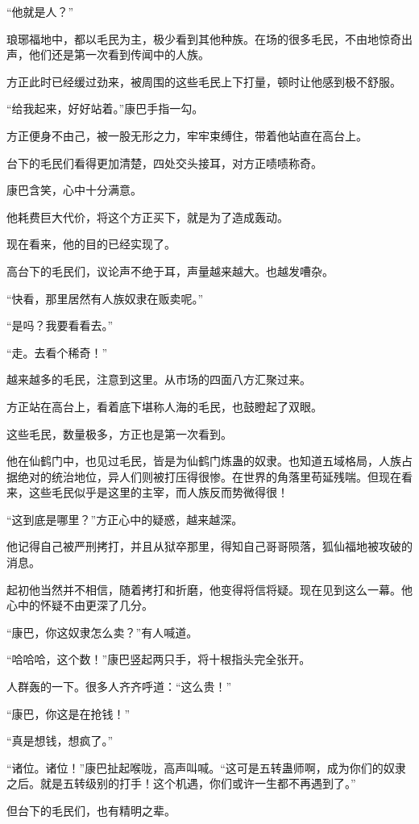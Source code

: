 \begin{this_body}
“他就是人？”

琅琊福地中，都以毛民为主，极少看到其他种族。在场的很多毛民，不由地惊奇出声，他们还是第一次看到传闻中的人族。

方正此时已经缓过劲来，被周围的这些毛民上下打量，顿时让他感到极不舒服。

“给我起来，好好站着。”康巴手指一勾。

方正便身不由己，被一股无形之力，牢牢束缚住，带着他站直在高台上。

台下的毛民们看得更加清楚，四处交头接耳，对方正啧啧称奇。

康巴含笑，心中十分满意。

他耗费巨大代价，将这个方正买下，就是为了造成轰动。

现在看来，他的目的已经实现了。

高台下的毛民们，议论声不绝于耳，声量越来越大。也越发嘈杂。

“快看，那里居然有人族奴隶在贩卖呢。”

“是吗？我要看看去。”

“走。去看个稀奇！”

越来越多的毛民，注意到这里。从市场的四面八方汇聚过来。

方正站在高台上，看着底下堪称人海的毛民，也鼓瞪起了双眼。

这些毛民，数量极多，方正也是第一次看到。

他在仙鹤门中，也见过毛民，皆是为仙鹤门炼蛊的奴隶。也知道五域格局，人族占据绝对的统治地位，异人们则被打压得很惨。在世界的角落里苟延残喘。但现在看来，这些毛民似乎是这里的主宰，而人族反而势微得很！

“这到底是哪里？”方正心中的疑惑，越来越深。

他记得自己被严刑拷打，并且从狱卒那里，得知自己哥哥陨落，狐仙福地被攻破的消息。

起初他当然并不相信，随着拷打和折磨，他变得将信将疑。现在见到这么一幕。他心中的怀疑不由更深了几分。

“康巴，你这奴隶怎么卖？”有人喊道。

“哈哈哈，这个数！”康巴竖起两只手，将十根指头完全张开。

人群轰的一下。很多人齐齐呼道：“这么贵！”

“康巴，你这是在抢钱！”

“真是想钱，想疯了。”

“诸位。诸位！”康巴扯起喉咙，高声叫喊。“这可是五转蛊师啊，成为你们的奴隶之后。就是五转级别的打手！这个机遇，你们或许一生都不再遇到了。”

但台下的毛民们，也有精明之辈。


\end{this_body}
